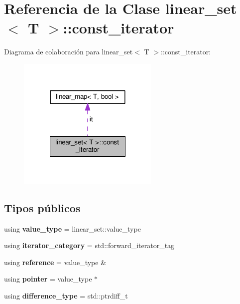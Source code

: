 \hypertarget{classlinear__set_1_1const__iterator}{\section{Referencia de la Clase linear\-\_\-set$<$ T $>$\-:\-:const\-\_\-iterator}
\label{classlinear__set_1_1const__iterator}
}


Diagrama de colaboración para linear\-\_\-set$<$ T $>$\-:\-:const\-\_\-iterator\-:\nopagebreak
\begin{figure}[H]
\begin{center}
\leavevmode
\includegraphics[width=192pt]{classlinear__set_1_1const__iterator__coll__graph}
\end{center}
\end{figure}
\subsection*{Tipos públicos}
\begin{DoxyCompactItemize}
\item 
\hypertarget{classlinear__set_1_1const__iterator_aeeb487937ec4d79cb6a1a08e73ac1f99}{using {\bfseries value\-\_\-type} = linear\-\_\-set\-::value\-\_\-type}\label{classlinear__set_1_1const__iterator_aeeb487937ec4d79cb6a1a08e73ac1f99}

\item 
\hypertarget{classlinear__set_1_1const__iterator_aa1f033d1d6817bba87a8a56db432f2e0}{using {\bfseries iterator\-\_\-category} = std\-::forward\-\_\-iterator\-\_\-tag}\label{classlinear__set_1_1const__iterator_aa1f033d1d6817bba87a8a56db432f2e0}

\item 
\hypertarget{classlinear__set_1_1const__iterator_a081f0692047d474e34e1ce924d3485ee}{using {\bfseries reference} = value\-\_\-type \&}\label{classlinear__set_1_1const__iterator_a081f0692047d474e34e1ce924d3485ee}

\item 
\hypertarget{classlinear__set_1_1const__iterator_acdc3e59c21faf9becf4c4dcf4ca1bef2}{using {\bfseries pointer} = value\-\_\-type $\ast$}\label{classlinear__set_1_1const__iterator_acdc3e59c21faf9becf4c4dcf4ca1bef2}

\item 
\hypertarget{classlinear__set_1_1const__iterator_ab68189d3b549fd08aea83d540cb7a1b0}{using {\bfseries difference\-\_\-type} = std\-::ptrdiff\-\_\-t}\label{classlinear__set_1_1const__iterator_ab68189d3b549fd08aea83d540cb7a1b0}

\end{DoxyCompactItemize}
